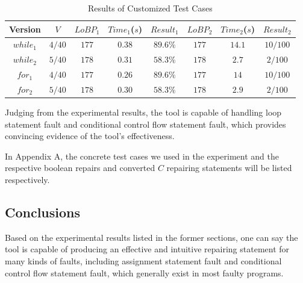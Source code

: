 \documentclass[10pt,journal,final,]{article}
\theoremstyle{definition}
\begin{document}
\begin{table}
\small
\center
\caption{Results of Customized Test Cases}
\label{table:RoCTC}
\begin{tabular}{|c|c|c|c|c|c|c|c|}
\hline
Version   & $V$     & $LoBP_{1}$ & $Time_{1}$($s$) & $Result_{1}$ &$LoBP_{2}$ & $Time_{2}$($s$) & $Result_{2}$ \\
\hline
$while_1$ & $4/40$  & $177$      & $0.38$          & $89.6\%$     & $177$     & $14.1$          & $10/100$     \\
\hline
$while_2$ & $5/40$  & $178$      & $0.31$          & $58.3\%$     & $178$     & $2.7$           & $2/100$      \\
\hline
$for_1$   & $4/40$  & $177$      & $0.26$          & $89.6\%$     & $177$     & $14$            & $10/100$     \\
\hline
$for_2$   & $5/40$  & $178$      & $0.30$          & $58.3\%$     & $178$     & $2.9$           & $2/100$      \\
\hline
\end{tabular}
\end{table}

Judging from the experimental results, the tool is capable of handling loop statement fault and conditional control flow statement fault,
which provides convincing evidence of the tool's effectiveness.

In Appendix A, the concrete test cases we used in the experiment and the respective boolean repairs and converted $C$ repairing statements will be listed respectively.

\subsection{Conclusions}
Based on the experimental results listed in the former sections, one can say the tool is capable of producing an effective and intuitive repairing statement for many kinds of faults,
including assignment statement fault and conditional control flow statement fault, which generally exist in most faulty programs.
\end{document}
